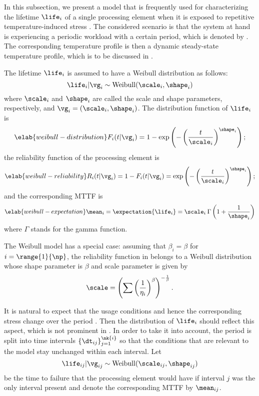 In this subsection, we present a model that is frequently used for
characterizing the lifetime $\life_i$ of a single processing element when it is
exposed to repetitive temperature-induced stress \cite{huang2009b, xiang2010}.
The considered scenario is that the system at hand is experiencing a periodic
workload with a certain period, which is denoted by \period. The corresponding
temperature profile is then a dynamic steady-state temperature profile, which is
to be discussed in .

The lifetime $\life_i$ is assumed to have a Weibull distribution as follows:
\[
  \life_i | \vg_i \sim \mathrm{Weibull}(\scale_i, \shape_i)
\]
where $\scale_i$ and $\shape_i$ are called the scale and shape parameters,
respectively, and $\vg_i = (\scale_i, \shape_i)$. The distribution function of
$\life_i$ is
\begin{equation} \elab{weibull-distribution}
  F_i(t | \vg_i) = 1 - \exp\left(-\left(\frac{t}{\scale_i}\right)^{\shape_i}\right);
\end{equation}
the reliability function of the processing element is
\begin{equation} \elab{weibull-reliability}
  R_i(t | \vg_i) = 1 - F_i(t | \vg_i) = \exp\left(-\left(\frac{t}{\scale_i}\right)^{\shape_i}\right);
\end{equation}
and the corresponding \ac{MTTF} is
\begin{equation} \elab{weibull-expectation}
  \mean_i = \expectation{\life_i} = \scale_i \: \Gamma\left(1 + \frac{1}{\shape_i}\right)
\end{equation}
where $\Gamma$ stands for the gamma function.

\begin{remark} 
The Weibull model has a special case: assuming that $\beta_i = \beta$ for $i =
\range{1}{\np}$, the reliability function in  belongs to
a Weibull distribution whose shape parameter is $\beta$ and scale parameter is
given by
\[
  \scale = \left(\sum\left(\frac{1}{\eta_i}\right)^\beta\right)^{-\frac{1}{\beta}}.
\]
\end{remark}

It is natural to expect that the usage conditions and hence the corresponding
stress change over the period \period. Then the distribution of $\life_i$ should
reflect this aspect, which is not prominent in . In
order to take it into account, the period is split into  time intervals
$\{ \dt_{ij} \}_{j = 1}^{\nk{i}}$ so that the conditions that are relevant to
the model stay unchanged within each interval. Let
\[
  \life_{ij} | \vg_{ij} \sim \mathrm{Weibull}(\scale_{ij}, \shape_{ij})
\]
be the time to failure that the processing element would have if interval $j$
was the only interval present and denote the corresponding \ac{MTTF} by
$\mean_{ij}$.

